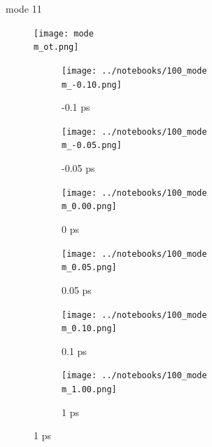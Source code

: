 \documentclass{beamer}
\newcommand\w{0.32}
\begin{document}
\renewcommand\m{11}
\begin{frame}{mode \m}
		\vspace{\vh mm}
	\begin{figure}
		\centering
		\texttt{[image: mode\\m\_ot.png]}
	\end{figure}
	\begin{figure}
		\centering
		\begin{subfigure}[b]{\w\textwidth}
			\centering
			\texttt{[image: ../notebooks/100\_mode\\m\_-0.10.png]}
			\caption{-0.1 ps}
		\end{subfigure}
		\begin{subfigure}[b]{\w\textwidth}
			\centering
			\texttt{[image: ../notebooks/100\_mode\\m\_-0.05.png]}
			\caption{-0.05 ps}
		\end{subfigure}
		\begin{subfigure}[b]{\w\textwidth}
			\centering
			\texttt{[image: ../notebooks/100\_mode\\m\_0.00.png]}
			\caption{0 ps}
		\end{subfigure}
		\begin{subfigure}[b]{\w\textwidth}
			\centering
			\texttt{[image: ../notebooks/100\_mode\\m\_0.05.png]}
			\caption{0.05 ps}
		\end{subfigure}
		\begin{subfigure}[b]{\w\textwidth}
			\centering
			\texttt{[image: ../notebooks/100\_mode\\m\_0.10.png]}
			\caption{0.1 ps}
		\end{subfigure}
		\begin{subfigure}[b]{\w\textwidth}
			\centering
			\texttt{[image: ../notebooks/100\_mode\\m\_1.00.png]}
			\caption{1 ps}
		\end{subfigure}
	\end{figure}
\end{frame}
\end{document}
